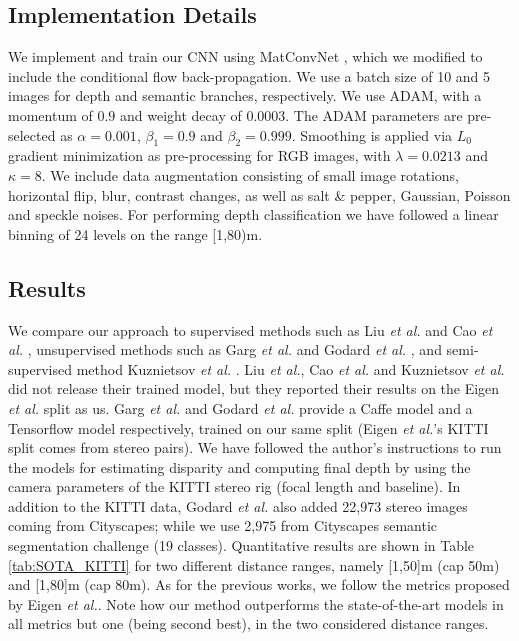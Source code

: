 \documentclass[letterpaper, 10 pt, conference]{ieeeconf}
\newcommand{\etal}{{\em et al.}}
\newcommand{\Tab}[1]{Table \ref{tab:#1}}
\begin{document}
\subsection{Implementation Details}
We implement and train our CNN using MatConvNet \cite{Vedaldi:2015}, which we modified to include the conditional flow back-propagation. We use a batch size of 10 and 5 images for depth and semantic branches, respectively. We use ADAM, with a momentum of $0.9$ and weight decay of $0.0003$. The ADAM parameters are pre-selected as $\alpha=0.001$, $\beta_1=0.9$ and $\beta_2=0.999$.  Smoothing is applied via $L_{0}$ gradient minimization  \cite{Xu:2011} as pre-processing for RGB images, with $\lambda=0.0213$ and $\kappa=8$. We include data augmentation consisting of small image rotations, horizontal flip, blur, contrast changes, as well as salt \& pepper, Gaussian, Poisson and speckle noises. For performing depth classification we have followed a linear binning of 24 levels on the range [1,80)m.

\subsection{Results}




We compare our approach to supervised methods such as Liu {\etal} \cite{Liu:2016} and Cao {\etal} \cite{Cao:2017}, unsupervised methods such as Garg {\etal} \cite{Garg:2016} and Godard {\etal} \cite{Godard:2017}, and semi-supervised method Kuznietsov {\etal} \cite{Kuznietsov:2017}. Liu {\etal}, Cao {\etal} and Kuznietsov {\etal} did not release their trained model, but they reported their results on the Eigen {\etal} split as us. Garg {\etal} and Godard {\etal} provide a Caffe model and a Tensorflow model respectively, trained on our same split (Eigen {\etal}'s KITTI split comes from stereo pairs). We have followed the author's instructions to run the models for estimating disparity and computing final depth by using the camera parameters of the KITTI stereo rig (focal length and baseline). In addition to the KITTI data, Godard {\etal} also added 22,973 stereo images coming from Cityscapes; while we use 2,975 from Cityscapes semantic segmentation challenge (19 classes). Quantitative results are shown in \Tab{SOTA_KITTI} for two different distance ranges, namely [1,50]m (cap 50m) and [1,80]m (cap 80m). As for the previous works, we follow the metrics proposed by Eigen {\etal}. Note how our method outperforms the state-of-the-art models in all metrics but one (being second best), in the two considered distance ranges. 
\end{document}
